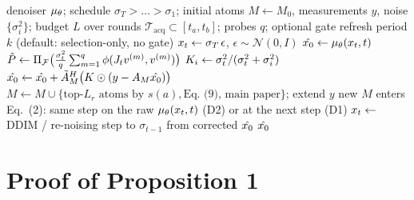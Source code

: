 \documentclass[10pt,twocolumn,letterpaper]{article}
\begin{document}
\begin{algorithm}[t]
\caption{\pvas: variance-guided active sensing in a single trajectory}
\label{alg:pvas}
\begin{algorithmic}[1]
\Require denoiser $\mu_\theta$; schedule $\sigma_T > \dots > \sigma_1$; initial
atoms $M \gets M_0$, measurements $y$, noise $\{\sigma_i^2\}$; budget $L$
over rounds $\mathcal{T}_{\mathrm{acq}} \subset [t_a, t_b]$; probes $q$;
optional gate refresh period $k$ (default: selection-only, no gate)
\State $x_t \gets \sigma_T\,\epsilon$, \quad $\epsilon \sim \mathcal{N}(0, I)$
  \State $\hat{x_0} \gets \mu_\theta(x_t, t)$ \Comment{1 \nfe}
    \State $\hat{P} \gets \Pi_{\mathcal{F}}\big(\tfrac{\sigma_t^2}{q} \sum_{m=1}^{q}
      \phi(J_t v^{(m)}, v^{(m)})\big)$ 
  \EndIf
  \State $K_i \gets \sigma_t^2 / (\sigma_t^2 + \sigma_i^2)$ 
  \State $\hat{x_0} \gets \hat{x_0} + \tilde{A}_M^{H}\big(K \odot (y - A_M \hat{x_0})\big)$ 
    \State $M \gets M \cup \{\text{top-}L_r \text{ atoms by } s(a), \text{Eq.~(9), main paper}\}$; extend $y$
    \State new $M$ enters Eq.~(2): same step on the raw $\mu_\theta(x_t,t)$ (D2) or at the next step (D1) 
  \EndIf
  \State $x_t \gets$ DDIM / re-noising step to $\sigma_{t-1}$ from corrected $\hat{x_0}$
\EndFor
\State \Return $\hat{x_0}$
\end{algorithmic}
\end{algorithm}

\section{Proof of Proposition 1}\label{sec:supp_proof}
\end{document}
